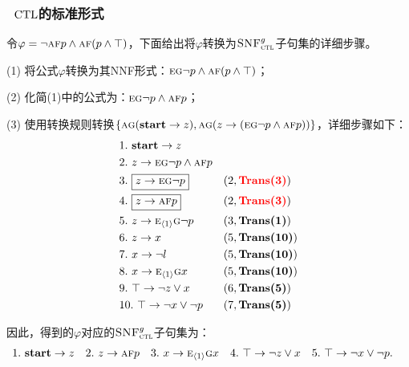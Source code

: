 \documentclass[9pt, CJK]{beamer}
\begin{document}
\begin{frame}
	\frametitle{~$\textrm{CTL}$的标准形式}
	\begin{example}\label{examp:Tran}
		\tiny
		令$\varphi=\neg \textsc{a} \textsc{f} p \wedge \textsc{a}\textsc{f}(p \wedge \top)$，下面给出将$\varphi$转换为${\textsc{SNF}_{\textsc{ctl}}^g}$子句集的详细步骤。
		
		(1) 将公式$\varphi$转换为其NNF形式：$\textsc{e}\textsc{g} \neg p \wedge \textsc{a}\textsc{f}(p \wedge \top)$；
		
		(2) 化简(1)中的公式为：$\textsc{e}\textsc{g} \neg p \wedge \textsc{a}\textsc{f} p$；
		
		(3) 使用转换规则转换$\{\textsc{a}\textsc{g}(\textbf{start} \rightarrow z), \textsc{a}\textsc{g}(z \rightarrow (\textsc{e}\textsc{g} \neg p \wedge \textsc{a}\textsc{f} p))\}$，详细步骤如下：
		\begin{align*}
			&1.\ \textbf{start} \rightarrow z && \\
			&2.\ z \rightarrow \textsc{e}\textsc{g} \neg p \wedge \textsc{a}\textsc{f} p &&  \\
			& 3.\ \boxed{z \rightarrow  \textsc{e}\textsc{g} \neg p} && (2, \textcolor{red}{\textbf{Trans(3)}})\\
			&4.\ \boxed{z \rightarrow \textsc{a}\textsc{f} p} && (2, \textcolor{red}{\textbf{Trans(3)}})\\
			&5.\ z \rightarrow  \textsc{e}_{{\langle{1}\rangle}}\textsc{g} \neg p  && (3, \textbf{Trans(1)})\\
			&6.\ z \rightarrow x && (5, \textbf{Trans(10)})\\
			&7.\ x\rightarrow \neg l && (5, \textbf{Trans(10)})\\
			&8.\ x\rightarrow \textsc{e}_{{\langle{1}\rangle}} \textsc{g} x&& (5, \textbf{Trans(10)})\\
			&9.\ \top \rightarrow \neg z \vee x && (6, \textbf{Trans(5)}) \\
			&10.\ \top \rightarrow \neg x \vee \neg p && (7, \textbf{Trans(5)}) 
		\end{align*}
		
		因此，得到的$\varphi$对应的${\textsc{SNF}_{\textsc{ctl}}^g}$子句集为：
		\begin{align*}
			&1.\ \textbf{start} \rightarrow z && 2.\ z \rightarrow \textsc{a}\textsc{f} p && 3.\ x\rightarrow \textsc{e}_{{\langle{1}\rangle}} \textsc{g} x
			&& 4.\ \top \rightarrow \neg z \vee x && 5.\ \top \rightarrow \neg x \vee \neg p.
		\end{align*}
	\end{example}
\end{frame}
\end{document}
